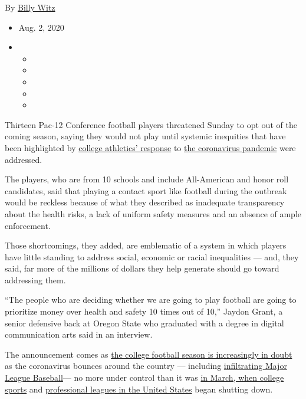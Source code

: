 By \href{https://www.nytimes.com/by/billy-witz}{Billy Witz}

\begin{itemize}
\item
  Aug. 2, 2020
\item
  \begin{itemize}
  \item
  \item
  \item
  \item
  \item
  \end{itemize}
\end{itemize}

Thirteen Pac-12 Conference football players threatened Sunday to opt out
of the coming season, saying they would not play until systemic
inequities that have been highlighted by
\href{https://www.nytimes.com/2020/07/16/sports/ncaafootball/ncaa-guidelines-fall-sports.html}{college
athletics' response} to
\href{https://www.nytimes.com/news-event/coronavirus}{the coronavirus
pandemic} were addressed.

The players, who are from 10 schools and include All-American and honor
roll candidates, said that playing a contact sport like football during
the outbreak would be reckless because of what they described as
inadequate transparency about the health risks, a lack of uniform safety
measures and an absence of ample enforcement.

Those shortcomings, they added, are emblematic of a system in which
players have little standing to address social, economic or racial
inequalities --- and, they said, far more of the millions of dollars
they help generate should go toward addressing them.

``The people who are deciding whether we are going to play football are
going to prioritize money over health and safety 10 times out of 10,''
Jaydon Grant, a senior defensive back at Oregon State who graduated with
a degree in digital communication arts said in an interview.

The announcement comes as
\href{https://www.nytimes.com/2020/07/10/sports/ncaafootball/coronavirus-college-football-season-canceled.html}{the
college football season is increasingly in doubt} as the coronavirus
bounces around the country --- including
\href{https://www.nytimes.com/2020/08/01/sports/baseball/coronavirus-cardinals.html}{infiltrating
Major League Baseball}--- no more under control than it was
\href{https://www.nytimes.com/2020/03/12/sports/ncaabasketball/ncaa-basketball-tournament-coronavirus.html}{in
March, when college sports} and
\href{https://www.nytimes.com/2020/03/12/sports/coronavirus-sports-canceled.html}{professional
leagues in the United States} began shutting down.

